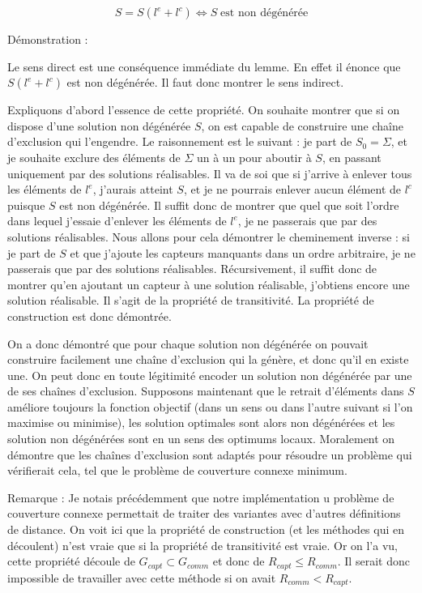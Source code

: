 \documentclass[12pt,a4paper]{article}
\begin{document}
\[S=S(l^e+l^c) \Leftrightarrow S\;\text{est non dégénérée}\]


Démonstration :

Le sens direct est une conséquence immédiate du lemme. En effet il énonce que $S(l^e+l^c)$ est non dégénérée. Il faut donc montrer le sens indirect.

Expliquons d'abord l'essence de cette propriété. On souhaite montrer que si on dispose d'une solution non dégénérée $S$, on est capable de construire une chaîne d'exclusion qui l'engendre. Le raisonnement est le suivant : je part de $S_0=\Sigma$, et je souhaite exclure des éléments de $\Sigma$ un à un pour aboutir à $S$, en passant uniquement par des solutions réalisables. Il va de soi que si j'arrive à enlever tous les éléments de $l^e$, j'aurais atteint $S$, et je ne pourrais enlever aucun élément de $l^c$ puisque $S$ est non dégénérée. Il suffit donc de montrer que quel que soit l'ordre dans lequel j'essaie d'enlever les éléments de $l^e$, je ne passerais que par des solutions réalisables. Nous allons pour cela démontrer le cheminement inverse :  si je part de $S$ et que j'ajoute les capteurs manquants dans un ordre arbitraire, je ne passerais que par des solutions réalisables. Récursivement, il suffit donc de montrer qu'en ajoutant un capteur à une solution réalisable, j'obtiens encore une solution réalisable. Il s'agit de la propriété de transitivité. La propriété de construction est donc démontrée.



On a donc démontré que pour chaque solution non dégénérée on pouvait construire facilement une chaîne d'exclusion qui la génère, et donc qu'il en existe une. On peut donc en toute légitimité encoder un solution non dégénérée par une de ses chaînes d'exclusion. Supposons maintenant que le retrait d'éléments dans $S$ améliore toujours la fonction objectif (dans un sens ou dans l'autre suivant si l'on maximise ou minimise), les solution optimales sont alors non dégénérées et les solution non dégénérées sont en un sens des optimums locaux. Moralement on démontre que les chaînes d'exclusion sont adaptés pour résoudre un problème qui vérifierait cela, tel que le problème de couverture connexe minimum.  


Remarque : Je notais précédemment que notre implémentation u problème de couverture connexe permettait de traiter des variantes avec d'autres définitions de distance. On voit ici que la propriété de construction (et les méthodes qui en découlent) n'est vraie que si la propriété de transitivité est vraie. Or on l'a vu, cette propriété découle de $G_{capt}\subset G_{comm}$ et donc de $R_{capt}\leq R_{comm}$. Il serait donc impossible de travailler avec cette méthode si on avait $R_{comm}<R_{capt}$.
\end{document}
